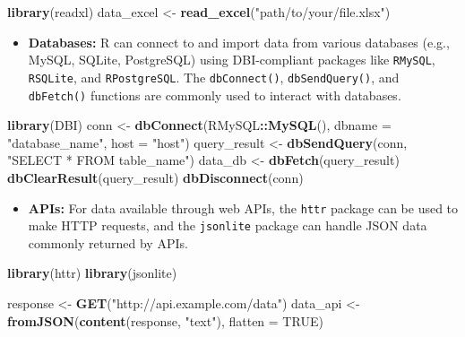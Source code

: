 \documentclass[
]{book}
\newenvironment{Shaded}{\begin{snugshade}}{\end{snugshade}}
\newcommand{\AttributeTok}[1]{\textcolor[rgb]{0.13,0.29,0.53}{#1}}
\newcommand{\ConstantTok}[1]{\textcolor[rgb]{0.56,0.35,0.01}{#1}}
\newcommand{\FunctionTok}[1]{\textcolor[rgb]{0.13,0.29,0.53}{\textbf{#1}}}
\newcommand{\NormalTok}[1]{#1}
\newcommand{\OtherTok}[1]{\textcolor[rgb]{0.56,0.35,0.01}{#1}}
\newcommand{\SpecialCharTok}[1]{\textcolor[rgb]{0.81,0.36,0.00}{\textbf{#1}}}
\newcommand{\StringTok}[1]{\textcolor[rgb]{0.31,0.60,0.02}{#1}}
\providecommand{\tightlist}{%
  \setlength{\itemsep}{0pt}\setlength{\parskip}{0pt}}
\begin{document}
\begin{Shaded}
\begin{Highlighting}[]
\FunctionTok{library}\NormalTok{(readxl)}
\NormalTok{data\_excel }\OtherTok{\textless{}{-}} \FunctionTok{read\_excel}\NormalTok{(}\StringTok{"path/to/your/file.xlsx"}\NormalTok{)}
\end{Highlighting}
\end{Shaded}

\begin{itemize}
\tightlist
\item
  \textbf{Databases:} R can connect to and import data from various databases (e.g., MySQL, SQLite, PostgreSQL) using DBI-compliant packages like \texttt{RMySQL}, \texttt{RSQLite}, and \texttt{RPostgreSQL}. The \texttt{dbConnect()}, \texttt{dbSendQuery()}, and \texttt{dbFetch()} functions are commonly used to interact with databases.
\end{itemize}

\begin{Shaded}
\begin{Highlighting}[]
\FunctionTok{library}\NormalTok{(DBI)}
\NormalTok{conn }\OtherTok{\textless{}{-}} \FunctionTok{dbConnect}\NormalTok{(RMySQL}\SpecialCharTok{::}\FunctionTok{MySQL}\NormalTok{(), }\AttributeTok{dbname =} \StringTok{"database\_name"}\NormalTok{, }\AttributeTok{host =} \StringTok{"host"}\NormalTok{)}
\NormalTok{query\_result }\OtherTok{\textless{}{-}} \FunctionTok{dbSendQuery}\NormalTok{(conn, }\StringTok{"SELECT * FROM table\_name"}\NormalTok{)}
\NormalTok{data\_db }\OtherTok{\textless{}{-}} \FunctionTok{dbFetch}\NormalTok{(query\_result)}
\FunctionTok{dbClearResult}\NormalTok{(query\_result)}
\FunctionTok{dbDisconnect}\NormalTok{(conn)}
\end{Highlighting}
\end{Shaded}

\begin{itemize}
\tightlist
\item
  \textbf{APIs:} For data available through web APIs, the \texttt{httr} package can be used to make HTTP requests, and the \texttt{jsonlite} package can handle JSON data commonly returned by APIs.
\end{itemize}

\begin{Shaded}
\begin{Highlighting}[]
\FunctionTok{library}\NormalTok{(httr)}
\FunctionTok{library}\NormalTok{(jsonlite)}

\NormalTok{response }\OtherTok{\textless{}{-}} \FunctionTok{GET}\NormalTok{(}\StringTok{"http://api.example.com/data"}\NormalTok{)}
\NormalTok{data\_api }\OtherTok{\textless{}{-}} \FunctionTok{fromJSON}\NormalTok{(}\FunctionTok{content}\NormalTok{(response, }\StringTok{"text"}\NormalTok{), }\AttributeTok{flatten =} \ConstantTok{TRUE}\NormalTok{)}
\end{Highlighting}
\end{Shaded}
\end{document}
